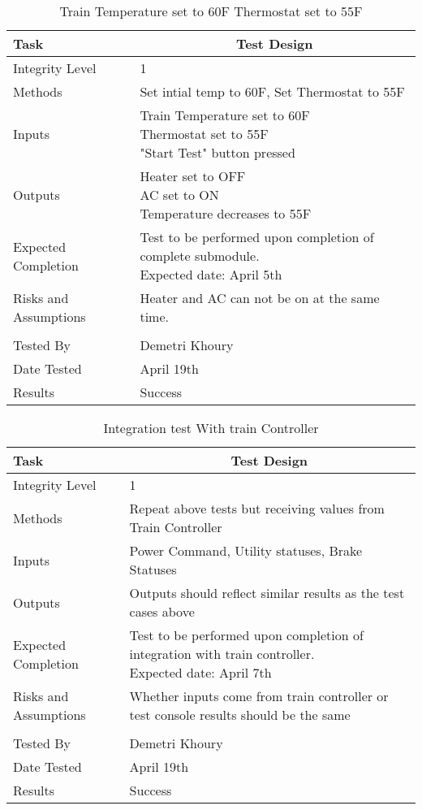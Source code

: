 \documentclass[]{article}
\begin{document}
	\begin{table}[H]
		\centering
		\caption{Train Temperature set to 60F Thermostat set to 55F}
		\begin{tabular}{|l|l|}
			\hline
			Task & \multicolumn{1}{c|}{Test Design} \\ \hline
			Integrity Level & 1 \\ \hline
			Methods & Set intial temp to 60F, Set Thermostat to 55F  \\ \hline
			Inputs &  \parbox[t]{10cm}{Train Temperature set to 60F\\ Thermostat set to 55F\\ "Start Test" button pressed }\\ \hline
			Outputs &\parbox[t]{10cm}{ Heater set to OFF\\AC set to ON\\ Temperature decreases to 55F} \\ \hline
			Expected Completion & \parbox[t]{10cm}{Test to be performed upon completion of complete submodule.\\ Expected date: April 5th}\\ \hline
			Risks and Assumptions & Heater and AC can not be on at the same time.\\ \hline
			\\ \hline
			Tested By   &  Demetri Khoury\\	\hline
			Date Tested & \parbox[t]{10cm}{April 19th}\\ \hline
			Results & Success\\ \hline
		\end{tabular}
	\end{table}

	\begin{table}[H]
		\centering
		\caption{Integration test With train Controller}
		\begin{tabular}{|l|l|}
			\hline
			Task & \multicolumn{1}{c|}{Test Design} \\ \hline
			Integrity Level & 1 \\ \hline
			Methods & Repeat above tests but receiving values from Train Controller \\ \hline
			Inputs &  Power Command, Utility statuses, Brake Statuses\\ \hline
			Outputs & Outputs should reflect similar results as the test cases above \\ \hline
			Expected Completion & \parbox[t]{10cm}{Test to be performed upon completion of integration with train controller.\\ Expected date: April 7th}\\ \hline
			Risks and Assumptions & \parbox[t]{10cm}{Whether inputs come from train controller or test console results should be the same}\\ \hline
				\\ \hline
			Tested By   &  Demetri Khoury\\	\hline
			Date Tested & \parbox[t]{10cm}{April 19th}\\ \hline
			Results &Success\\ \hline
		\end{tabular}
	\end{table}
\end{document}

